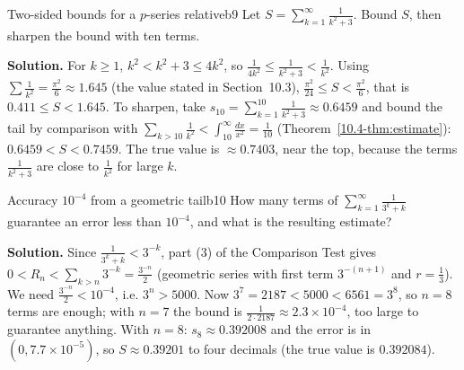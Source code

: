 \documentclass[11pt]{article}
\begin{document}
\begin{exmp}{Two-sided bounds for a $p$-series relative}{b9}
Let $S=\displaystyle\sum_{k=1}^\infty\frac1{k^2+3}$. Bound $S$, then sharpen the bound with ten terms.

\textbf{Solution.} For $k\ge1$, $k^2<k^2+3\le4k^2$, so $\frac1{4k^2}\le\frac1{k^2+3}<\frac1{k^2}$. Using $\sum\frac1{k^2}=\frac{\pi^2}6\approx1.645$ (the value stated in Section~10.3), $\frac{\pi^2}{24}\le S<\frac{\pi^2}6$, that is $0.411\le S<1.645$. To sharpen, take $s_{10}=\sum_{k=1}^{10}\frac1{k^2+3}\approx0.6459$ and bound the tail by comparison with $\sum_{k>10}\frac1{k^2}<\int_{10}^\infty\frac{dx}{x^2}=\frac1{10}$ (Theorem~\ref{10.4-thm:estimate}): $0.6459<S<0.7459$. The true value is $\approx0.7403$, near the top, because the terms $\frac1{k^2+3}$ are close to $\frac1{k^2}$ for large $k$.
\end{exmp}

\begin{exmp}{Accuracy $10^{-4}$ from a geometric tail}{b10}
How many terms of $\displaystyle\sum_{k=1}^\infty\frac1{3^k+k}$ guarantee an error less than $10^{-4}$, and what is the resulting estimate?

\textbf{Solution.} Since $\frac1{3^k+k}<3^{-k}$, part (3) of the Comparison Test gives $0<R_n<\sum_{k>n}3^{-k}=\frac{3^{-n}}2$ (geometric series with first term $3^{-(n+1)}$ and $r=\frac13$). We need $\frac{3^{-n}}2<10^{-4}$, i.e. $3^n>5000$. Now $3^7=2187<5000<6561=3^8$, so $n=8$ terms are enough; with $n=7$ the bound is $\frac1{2\cdot2187}\approx2.3\times10^{-4}$, too large to guarantee anything. With $n=8$: $s_8\approx0.392008$ and the error is in $(0,7.7\times10^{-5})$, so $S\approx0.39201$ to four decimals (the true value is $0.392084$).
\end{exmp}
\end{document}
